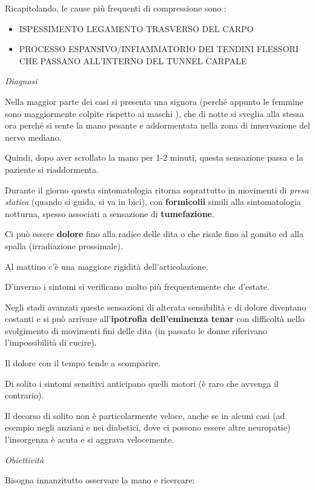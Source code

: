 \documentclass[]{article}
\begin{document}
Ricapitolando, le cause più frequenti di compressione sono :

\begin{itemize}
\item
  ISPESSIMENTO LEGAMENTO TRASVERSO DEL CARPO
\item
  PROCESSO ESPANSIVO/INFIAMMATORIO DEI TENDINI FLESSORI CHE PASSANO
  ALL'INTERNO DEL TUNNEL CARPALE
\end{itemize}

\emph{Diagnosi}

Nella maggior parte dei casi si presenta una signora (perché appunto le
femmine sono maggiormente colpite rispetto ai maschi ), che di notte si
sveglia alla stessa ora perché si sente la mano pesante e addormentata
nella zona di innervazione del nervo mediano.

Quindi, dopo aver scrollato la mano per 1-2 minuti, questa sensazione
passa e la paziente si riaddormenta.

Durante il giorno questa sintomatologia ritorna soprattutto in movimenti
di \emph{presa statica} (quando si guida, si va in bici), con
\textbf{formicolii} simili alla sintomatologia notturna, spesso
associati a sensazione di \textbf{tumefazione}.

Ci può essere \textbf{dolore} fino alla radice delle dita o che risale
fino al gomito ed alla spalla (irradiazione prossimale).

Al mattino c'è una maggiore rigidità dell'articolazione.

D'inverno i sintomi si verificano molto più frequentemente che d'estate.

Negli stadi avanzati queste sensazioni di alterata sensibilità e di
dolore diventano costanti e si può arrivare all'\textbf{ipotrofia
dell'eminenza tenar} con difficoltà nello svolgimento di movimenti fini
delle dita (in passato le donne riferivano l'impossibilità di cucire).

Il dolore con il tempo tende a scomparire.

Di solito i sintomi sensitivi anticipano quelli motori (è raro che
avvenga il contrario).

Il decorso di solito non è particolarmente veloce, anche se in alcuni
casi (ad esempio negli anziani e nei diabetici, dove ci possono essere
altre neuropatie) l'insorgenza è acuta e si aggrava velocemente.

\emph{Obiettività }

Bisogna innanzitutto osservare la mano e ricercare:
\end{document}
